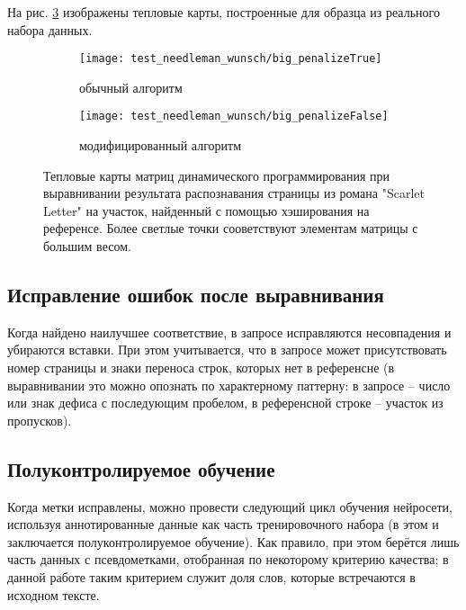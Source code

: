 \documentclass{main.tex}[subfiles]
\begin{document}
На рис. \ref{fig:needleman_real} изображены тепловые карты, построенные для образца из реального набора данных. %

\begin{figure}[H]
    \centering
    \begin{subfigure}{.5\textwidth}
        \centering
        \texttt{[image: test\_needleman\_wunsch/big\_penalizeTrue]}
        \caption{обычный алгоритм}
        \label{fig:needleman_real:usual}
    \end{subfigure}%
    \begin{subfigure}{.5\textwidth}
        \centering
        \texttt{[image: test\_needleman\_wunsch/big\_penalizeFalse]}
        \caption{модифицированный алгоритм}
        \label{fig:needleman_real:modified}
    \end{subfigure}
    \caption{Тепловые карты матриц динамического программирования при выравнивании результата распознавания страницы из романа "Scarlet Letter"\hspace{0pt} на участок, найденный с помощью хэширования на референсе.
    Более светлые точки сооветствуют элементам матрицы с большим весом.}
    \label{fig:needleman_real}
\end{figure}


\subsection{Исправление ошибок после выравнивания}

Когда найдено наилучшее соответствие, в запросе исправляются несовпадения и убираются вставки.
При этом учитывается, что в запросе может присутствовать номер страницы и знаки переноса строк, которых нет в референсне (в выравнивании это можно опознать по характерному паттерну: в запросе -- число или знак дефиса с последующим пробелом, в референсной строке -- участок из пропусков).

\subsection{Полуконтролируемое обучение}

Когда метки исправлены, можно провести следующий цикл обучения нейросети, используя аннотированные данные как часть тренировочного набора (в этом и заключается полуконтролируемое обучение).
Как правило, при этом берётся лишь часть данных с псевдометками, отобранная по некоторому критерию качества; в данной работе таким критерием служит доля слов, которые встречаются в исходном тексте.
\end{document}

